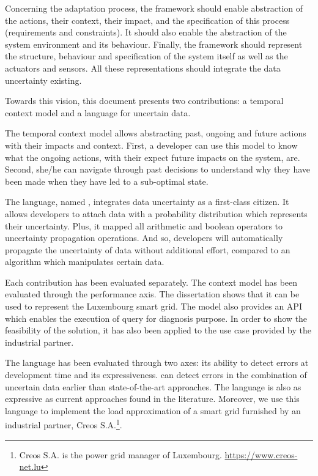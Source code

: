 Concerning the adaptation process, the framework should enable abstraction of the actions, their context, their impact, and the specification of this process (requirements and constraints).
It should also enable the abstraction of the system environment and its behaviour.
Finally, the framework should represent the structure, behaviour and specification of the system itself as well as the actuators and sensors.
All these representations should integrate the data uncertainty existing.

\bigskip
{}
Towards this vision, this document presents two contributions: a temporal context model and a language for uncertain data.

The temporal context model allows abstracting past, ongoing and future actions with their impacts and context.
First, a developer can use this model to know what the ongoing actions, with their expect future impacts on the system, are.
Second, she/he can navigate through past decisions to understand why they have been made when they have led to a sub-optimal state.

The language, named \langName, integrates data uncertainty as a first-class citizen.
It allows developers to attach data with a probability distribution which represents their uncertainty.
Plus, it mapped all arithmetic and boolean operators to uncertainty propagation operations. 
And so, developers will automatically propagate the uncertainty of data without additional effort, compared to an algorithm which manipulates certain data.

\bigskip
{}
Each contribution has been evaluated separately. 
The context model has been evaluated through the performance axis.
The dissertation shows that it can be used to represent the Luxembourg smart grid.
The model also provides an API which enables the execution of query for diagnosis purpose.
In order to show the feasibility of the solution, it has also been applied to the use case provided by the industrial partner.

The language has been evaluated through two axes: its ability to detect errors at development time and its expressiveness.
\langName{} can detect errors in the combination of uncertain data earlier than state-of-the-art approaches.
The language is also as expressive as current approaches found in the literature.
Moreover, we use this language to implement the load approximation of a smart grid furnished by an industrial partner, Creos S.A.\footnote{Creos S.A. is the power grid manager of Luxembourg. \url{https://www.creos-net.lu}}.

\bigskip
\bigskip
\bigskip
{}


